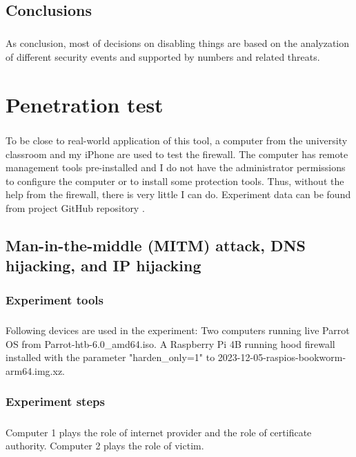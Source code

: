 \documentclass[mscthesis]{usiinfthesis}
\begin{document}
\section{Conclusions}
\paragraph{}
As conclusion, most of decisions on disabling things are based on the analyzation of different security events and supported by numbers and related threats.

\chapter{Penetration test}\label{cha:test}
\paragraph{}
To be close to real-world application of this tool, a computer from the university classroom and my iPhone are used to test the firewall. The computer has remote management tools pre-installed and I do not have the administrator permissions to configure the computer or to install some protection tools. Thus, without the help from the firewall, there is very little I can do. Experiment data can be found from project GitHub repository \citep{hood:github}.

\section{Man-in-the-middle (MITM) attack, DNS hijacking, and IP hijacking}
\subsection{Experiment tools}
\paragraph{}
Following devices are used in the experiment: Two computers running live Parrot OS from Parrot-htb-6.0\_amd64.iso. A Raspberry Pi 4B running hood firewall installed with the parameter "harden\_only=1" to 2023-12-05-raspios-bookworm-arm64.img.xz.

\subsection{Experiment steps}
\paragraph{}
Computer 1 plays the role of internet provider and the role of certificate authority. Computer 2 plays the role of victim.
\end{document}
